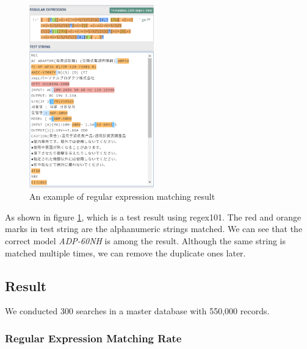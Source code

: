 \documentclass[technicalreport]{ieicej}
\begin{document}
        \begin{figure}[t] 
            \begin{center}
            \includegraphics[width=0.48\textwidth]{figure/result-regex.png}
            \end{center}
            \caption{An example of regular expression matching result}
            \label{fig:result-regex}
        \end{figure}

        As shown in figure \ref{fig:result-regex}, which is a test result using regex101\cite{regex101}. The red and orange marks in test string are the alphanumeric strings matched. We can see that the correct model {\em ADP-60NH} is among the result. Although the same string is matched multiple times, we can remove the duplicate ones later.

    \subsection{Result}
            
        We conducted 300 searches in a master database with 550,000 records.

        \subsubsection{Regular Expression Matching Rate}
\end{document}
